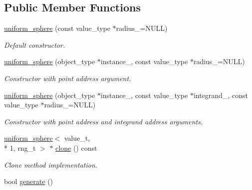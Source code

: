 \subsection*{Public Member Functions}
\begin{DoxyCompactItemize}
\item 
\hypertarget{a00550_a875be167ffb06c494c21cd9a60e8099a}{\hyperlink{a00550_a875be167ffb06c494c21cd9a60e8099a}{uniform\-\_\-sphere} (const value\-\_\-type $\ast$radius\-\_\-=N\-U\-L\-L)}\label{a00550_a875be167ffb06c494c21cd9a60e8099a}

\begin{DoxyCompactList}\small\item\em Default constructor. \end{DoxyCompactList}\item 
\hypertarget{a00550_a922e77d9935b9ff757ed182f9b966cf2}{\hyperlink{a00550_a922e77d9935b9ff757ed182f9b966cf2}{uniform\-\_\-sphere} (object\-\_\-type $\ast$instance\-\_\-, const value\-\_\-type $\ast$radius\-\_\-=N\-U\-L\-L)}\label{a00550_a922e77d9935b9ff757ed182f9b966cf2}

\begin{DoxyCompactList}\small\item\em Constructor with point address argument. \end{DoxyCompactList}\item 
\hypertarget{a00550_a9b70d5ad8b6301ea8760165005e5c28f}{\hyperlink{a00550_a9b70d5ad8b6301ea8760165005e5c28f}{uniform\-\_\-sphere} (object\-\_\-type $\ast$instance\-\_\-, const value\-\_\-type $\ast$integrand\-\_\-, const value\-\_\-type $\ast$radius\-\_\-=N\-U\-L\-L)}\label{a00550_a9b70d5ad8b6301ea8760165005e5c28f}

\begin{DoxyCompactList}\small\item\em Constructor with point address and integrand address arguments. \end{DoxyCompactList}\item 
\hypertarget{a00550_a49bc2c31def57ff2615fd22779e2ddf8}{\hyperlink{a00549}{uniform\-\_\-sphere}$<$ value\-\_\-t, \\*
1, rng\-\_\-t $>$ $\ast$ \hyperlink{a00550_a49bc2c31def57ff2615fd22779e2ddf8}{clone} () const }\label{a00550_a49bc2c31def57ff2615fd22779e2ddf8}

\begin{DoxyCompactList}\small\item\em Clone method implementation. \end{DoxyCompactList}\item 
\hypertarget{a00550_a794960777078db27c1b1e7d8fe7e0b38}{bool \hyperlink{a00550_a794960777078db27c1b1e7d8fe7e0b38}{generate} ()}\label{a00550_a794960777078db27c1b1e7d8fe7e0b38}


\end{DoxyCompactItemize}
